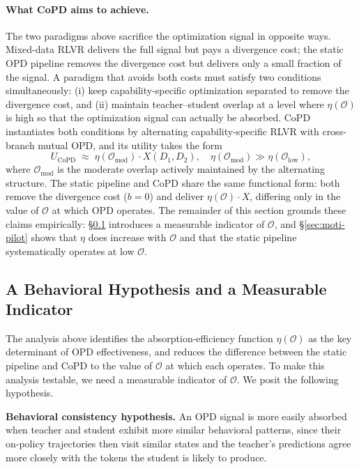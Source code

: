 \paragraph{What CoPD aims to achieve.}
The two paradigms above sacrifice the optimization signal in opposite ways. Mixed-data RLVR delivers the full signal but pays a divergence cost; the static OPD pipeline removes the divergence cost but delivers only a small fraction of the signal. A paradigm that avoids both costs must satisfy two conditions simultaneously: (i) keep capability-specific optimization separated to remove the divergence cost, and (ii) maintain teacher--student overlap at a level where $\eta(\mathcal{O})$ is high so that the optimization signal can actually be absorbed. CoPD instantiates both conditions by alternating capability-specific RLVR with cross-branch mutual OPD, and its utility takes the form
\begin{equation}
U_{\text{CoPD}} \;\approx\; \eta(\mathcal{O}_{\text{mod}}) \cdot X(D_1, D_2), \quad \eta(\mathcal{O}_{\text{mod}}) \gg \eta(\mathcal{O}_{\text{low}}),
\label{eq:utility-copd}
\end{equation}
where $\mathcal{O}_{\text{mod}}$ is the moderate overlap actively maintained by the alternating structure. The static pipeline and CoPD share the same functional form: both remove the divergence cost ($b = 0$) and deliver $\eta(\mathcal{O}) \cdot X$, differing only in the value of $\mathcal{O}$ at which OPD operates. The remainder of this section grounds these claims empirically: \S\ref{sec:moti-hypothesis} introduces a measurable indicator of $\mathcal{O}$, and \S\ref{sec:moti-pilot} shows that $\eta$ does increase with $\mathcal{O}$ and that the static pipeline systematically operates at low $\mathcal{O}$.

\subsection{A Behavioral Hypothesis and a Measurable Indicator}
\label{sec:moti-hypothesis}

The analysis above identifies the absorption-efficiency function $\eta(\mathcal{O})$ as the key determinant of OPD effectiveness, and reduces the difference between the static pipeline and CoPD to the value of $\mathcal{O}$ at which each operates. To make this analysis testable, we need a measurable indicator of $\mathcal{O}$. We posit the following hypothesis.

\begin{tcolorbox}[colback=gray!8, colframe=gray!50, boxrule=0.5pt, arc=2pt]
\textbf{Behavioral consistency hypothesis.} An OPD signal is more easily absorbed when teacher and student exhibit more similar behavioral patterns, since their on-policy trajectories then visit similar states and the teacher's predictions agree more closely with the tokens the student is likely to produce.
\end{tcolorbox}

